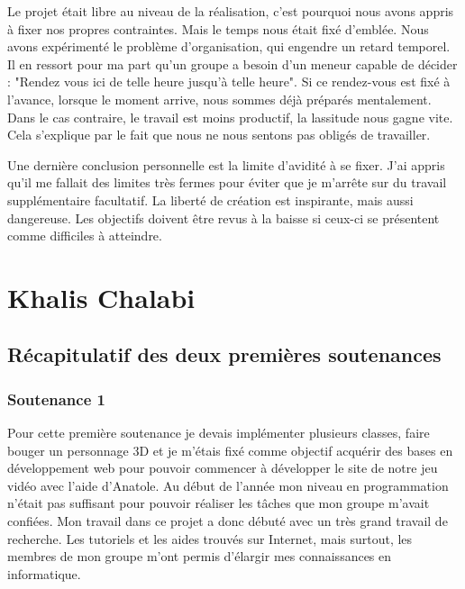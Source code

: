\documentclass[12pt]{article}
\begin{document}
\par
Le projet était libre au niveau de la réalisation, c'est pourquoi nous avons appris à fixer nos propres contraintes. Mais le temps nous était fixé d'emblée. Nous avons expérimenté le problème d'organisation, qui engendre un retard temporel. Il en ressort pour ma part qu'un groupe a besoin d'un meneur capable de décider : "Rendez vous ici de telle heure jusqu'à telle heure". Si ce rendez-vous est fixé à l'avance, lorsque le moment arrive, nous sommes déjà préparés mentalement. Dans le cas contraire, le travail est moins productif, la lassitude nous gagne vite. Cela s'explique par le fait que nous ne nous sentons pas obligés de travailler. 

\par
Une dernière conclusion personnelle est la limite d'avidité à se fixer. J'ai appris qu'il me fallait des limites très fermes pour éviter que je m'arrête sur du travail supplémentaire facultatif. La liberté de création est inspirante, mais aussi dangereuse. Les objectifs doivent être revus à la baisse si ceux-ci se présentent comme difficiles à atteindre.



\newpage

\section{Khalis Chalabi}
\subsection{Récapitulatif des deux premières soutenances}
\subsubsection{Soutenance 1}
Pour cette première soutenance je devais implémenter plusieurs classes, faire bouger un personnage 3D et je m'étais fixé comme objectif acquérir des bases en développement web pour pouvoir commencer à développer le site de notre jeu vidéo avec l'aide d'Anatole. Au début de l'année mon niveau en programmation n'était pas suffisant pour pouvoir réaliser les tâches que mon groupe m'avait confiées. Mon travail dans ce projet a donc débuté avec un très grand travail de recherche. Les tutoriels et les aides trouvés sur Internet, mais surtout, les membres de mon groupe m'ont permis d'élargir mes connaissances en informatique.
\end{document}

